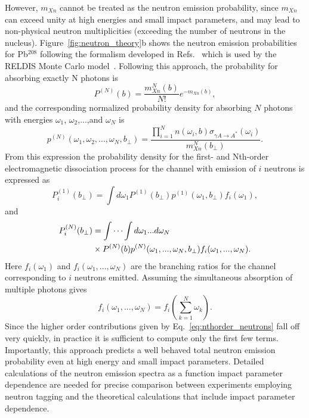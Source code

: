 \documentclass[12pt,epjc3]{svjour3}\sloppy
\begin{document}
However, $m_{Xn}$ cannot be treated as the neutron emission probability, since $m_{Xn}$ can exceed unity at high energies and small impact parameters, and may lead to non-physical neutron multiplicities (exceeding the number of neutrons in the nucleus). 
Figure~\ref{fig:neutron_theory}b shows the neutron emission probabilities for Pb$^{208}$ following the formalism developed in Refs.~\cite{pshenichnovMutualHeavyIon2001a,PhysRevC.60.044901} which is used by the RELDIS Monte Carlo model~\cite{pshenichnovElectromagneticExcitationFragmentation2011}.
Following this approach, the probability for absorbing exactly N photons is 
\begin{equation}
    P^{(N)}(b) = \frac{m^{N}_{Xn}(b)}{N!}e^{-m_{Xn}(b)},
\label{eq:probN_photons}
\end{equation}
and the corresponding normalized probability density for absorbing $N$ photons with energies $\omega_{1}$, $\omega_{2}$,...,and $\omega_{N}$ is~\cite{brandenburgAcoplanarityQEDPairs2020b}
\begin{equation}
    p^{(N)}(\omega_{1},\omega_{2},...,\omega_{N},b_\perp) =\frac{\prod_{i=1}^{N}n(\omega_{i},b)\sigma_{\gamma A\rightarrow A^{*}}(\omega_{i})}{m^{N}_{Xn}(b_\perp)}.
    \label{eq:photon_prob}
\end{equation}
From this expression the probability density for the first- and Nth-order electromagnetic dissociation process for the channel with emission of $i$ neutrons is expressed as
\begin{equation}
    P^{(1)}_{i}(b_\perp) =\int d\omega_{1} P^{(1)}(b_\perp) p^{(1)}(\omega_{1},b_\perp)f_{i}(\omega_{1}),
    \label{equation7}
\end{equation}
and
\begin{align}
    \label{eq:nthorder_neutrons}
    \begin{split}
    P^{(N)}_{i}(b_\perp) & = \idotsint d\omega_{1}...d\omega_{N} \\
    &\times P^{(N)}(b) p^{(N)}(\omega_{1},...,\omega_{N},b_\perp) f_{i}(\omega_{1},...,\omega_{N}).
    \end{split}
\end{align}    
Here $f_{i}(\omega_{1})$ and $f_{i}(\omega_{1},...,\omega_{N})$ are the branching ratios for the channel corresponding to $i$ neutrons emitted. Assuming the simultaneous absorption of multiple photons gives 
\begin{equation}
    f_{i}(\omega_{1},...,\omega_{N}) =f_{i}(\sum_{k =1}^{N}\omega_{k}).
\end{equation}
Since the higher order contributions given by Eq.~\ref{eq:nthorder_neutrons} fall off very quickly, in practice it is sufficient to compute only the first few terms. Importantly, this approach predicts a well behaved total neutron emission probability even at high energy and small impact parameters.
Detailed calculations of the neutron emission spectra as a function impact parameter dependence are needed for precise comparison between experiments employing neutron tagging and the theoretical calculations that include impact parameter dependence.
\end{document}
